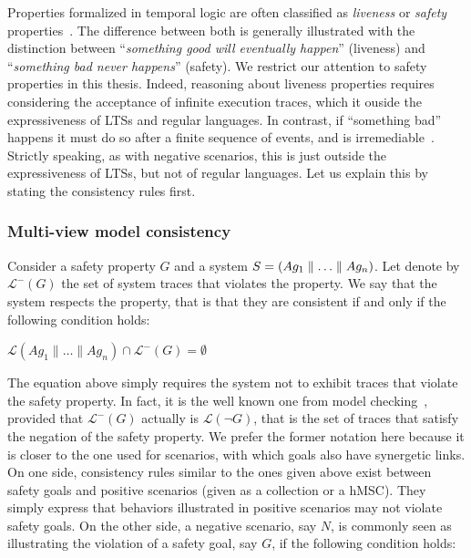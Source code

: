 Properties formalized in temporal logic are often classified as \emph{liveness} or \emph{safety} properties~\cite{Alpern:1986}. The difference between both is generally illustrated with the distinction between ``\emph{something good will eventually happen}'' (liveness) and  ``\emph{something bad never happens}'' (safety). We restrict our attention to safety properties in this thesis. Indeed, reasoning about liveness properties requires considering the acceptance of infinite execution traces, which it ouside the expressiveness of LTSs and regular languages. In contrast, if ``something bad'' happens it must do so after a finite sequence of events, and is irremediable~\cite{Alpern:1986, Giannakopoulou:1999}. Strictly speaking, as with negative scenarios, this is just outside the expressiveness of LTSs, but not of regular languages. Let us explain this by stating the consistency rules first.

\subsubsection*{Multi-view model consistency}

Consider a safety property $G$ and a system $S = (Ag_1 \parallel \ldots \parallel Ag_n)$. Let denote by $\mathcal{L}^{-}(G)$ the set of system traces that violates the property. We say that the system respects the property, that is that they are consistent if and only if the following condition holds:

\begin{center}
$\mathcal{L}(Ag_1 \parallel \ldots \parallel Ag_n) \cap \mathcal{L}^{-}(G) = \emptyset$
\end{center}

The equation above simply requires the system not to exhibit traces that violate the safety property. In fact, it is the well known one from model checking~\cite{Clarke:1989}, provided that $\mathcal{L}^{-}(G)$ actually is $\mathcal{L}(\neg G)$, that is the set of traces that satisfy the negation of the safety property. We prefer the former notation here because it is closer to the one used for scenarios, with which goals also have synergetic links. On one side, consistency rules similar to the ones given above exist between safety goals and positive scenarios (given as a collection or a hMSC). They simply express that behaviors illustrated in positive scenarios may not violate safety goals. On the other side, a negative scenario, say $N$, is commonly seen as illustrating the violation of a safety goal, say $G$, if the following condition holds:

